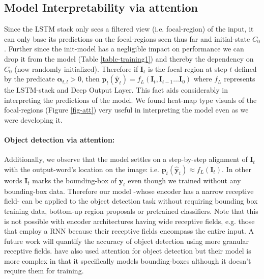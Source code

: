 \documentclass{article}
\begin{document}
\subsection{Model Interpretability via attention} Since the LSTM stack only sees a filtered view (i.e. focal-region) of the input, it can only base its predictions on the focal-regions seen thus far and initial-state $C_0$. Further since the init-model has a negligible impact on performance we can drop it from the model (Table \ref{table-training1}) and thereby the dependency on $C_0$ (now randomly initialized). Therefore if $\boldsymbol{I}_t$ is the focal-region at step $t$ defined by the predicate $\boldsymbol{\alpha}_{t,l} > 0$, then $ \boldsymbol{p}_t \left(\hat{\boldsymbol{y}}_t \right) = f_L\left( \boldsymbol{I}_t, \boldsymbol{I}_{t-1} \ldots \boldsymbol{I}_0 \right)$ where $f_L$ represents the LSTM-stack and Deep Output Layer. This fact aids considerably in interpreting the predictions of the model. We found heat-map type visuals of the focal-regions (Figure \ref{fig-att}) very useful in interpreting the model even as we were developing it.
\paragraph{Object detection via attention:}
Additionally, we observe that the model settles on a step-by-step alignment of $\boldsymbol{I}_t$ with the output-word's location on the image: i.e. $\boldsymbol{p}_t \left(\hat{\boldsymbol{y}}_t \right) \approx f_L\left( \boldsymbol{I}_t \right)$. In other words $\boldsymbol{I}_t$ marks the bounding-box of $\hat{\boldsymbol{y}}_t$ even though we trained without any bounding-box data. Therefore our model -whose encoder has a narrow receptive field- can be applied to the object detection task without requiring bounding box training data, bottom-up region proposals or pretrained classifiers. Note that this is not possible with encoder architectures having wide receptive fields, e.g. those that employ a RNN \cite{Deng2017ImagetoMarkupGW, Bahdanau2014NeuralMT} because their receptive fields encompass the entire input. A future work will quantify the accuracy of object detection \cite{Liu2017AttentionCI} using more granular receptive fields. \citet{DBLP:journals/corr/PedersoliLSV16} have also used attention for object detection but their model is more complex in that it specifically models bounding-boxes although it doesn't require them for training.
\end{document}
